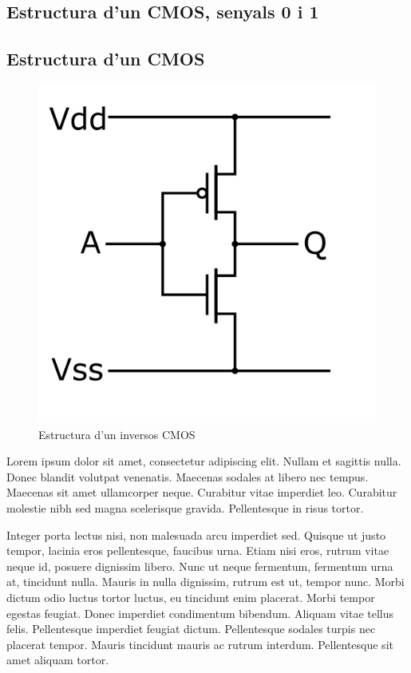 \documentclass[11pt,a4paper]{article}
\begin{document}
\subsection{Estructura d'un CMOS, senyals 0 i 1}


\subsection{Estructura d'un CMOS}

\begin{figure}
    \centering
    \includegraphics[width=\linewidth]{images/CMOS_inverter.png}
    \caption{Estructura d'un inversos CMOS}
    \vspace{-0.5cm}
\end{figure}


Lorem ipsum dolor sit amet, consectetur adipiscing elit. Nullam et sagittis nulla. Donec blandit volutpat venenatis. Maecenas sodales at libero nec tempus. Maecenas sit amet ullamcorper neque. Curabitur vitae imperdiet leo. Curabitur molestie nibh sed magna scelerisque gravida. Pellentesque in risus tortor.

Integer porta lectus nisi, non malesuada arcu imperdiet sed. Quisque ut justo tempor, lacinia eros pellentesque, faucibus urna. Etiam nisi eros, rutrum vitae neque id, posuere dignissim libero. Nunc ut neque fermentum, fermentum urna at, tincidunt nulla. Mauris in nulla dignissim, rutrum est ut, tempor nunc. Morbi dictum odio luctus tortor luctus, eu tincidunt enim placerat. Morbi tempor egestas feugiat. Donec imperdiet condimentum bibendum. Aliquam vitae tellus felis. Pellentesque imperdiet feugiat dictum. Pellentesque sodales turpis nec placerat tempor. Mauris tincidunt mauris ac rutrum interdum. Pellentesque sit amet aliquam tortor.
\end{document}
